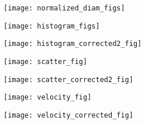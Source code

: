 \begin{figure}[t!]
	\centering
	\texttt{[image: normalized\_diam\_figs]}
	\caption{}
	\label{fig:normalized}
\end{figure}

\begin{figure*}[t!]
	\centering
	\begin{subfigure}{0.5\linewidth}
			\centering
	\texttt{[image: histogram\_figs]}
\caption{}
	\end{subfigure}\hfill
\begin{subfigure}{0.5\linewidth}
		\centering
	\texttt{[image: histogram\_corrected2\_fig]}
	\caption{}
\end{subfigure}
	\caption{}
	\label{fig:histogram}
\end{figure*}

\begin{figure*}[t!]
	\centering
	\begin{subfigure}{0.5\linewidth}
			\centering
		\texttt{[image: scatter\_fig]}
		\caption{}
		\label{fig:scatter_init}
	\end{subfigure}\hfill
	\begin{subfigure}{0.5\linewidth}
			\centering
		\texttt{[image: scatter\_corrected2\_fig]}
		\caption{}
	\end{subfigure}
	\caption{}
	\label{fig:scatter}
\end{figure*}


\begin{figure*}[t!]
	\centering
	\begin{subfigure}{0.5\linewidth}
		\centering
		\texttt{[image: velocity\_fig]}
		\caption{}
	\end{subfigure}\hfill
	\begin{subfigure}{0.5\linewidth}
		\centering
		\texttt{[image: velocity\_corrected\_fig]}
		\caption{}
	\end{subfigure}
	\caption{}
	\label{fig:velocity}
\end{figure*}




